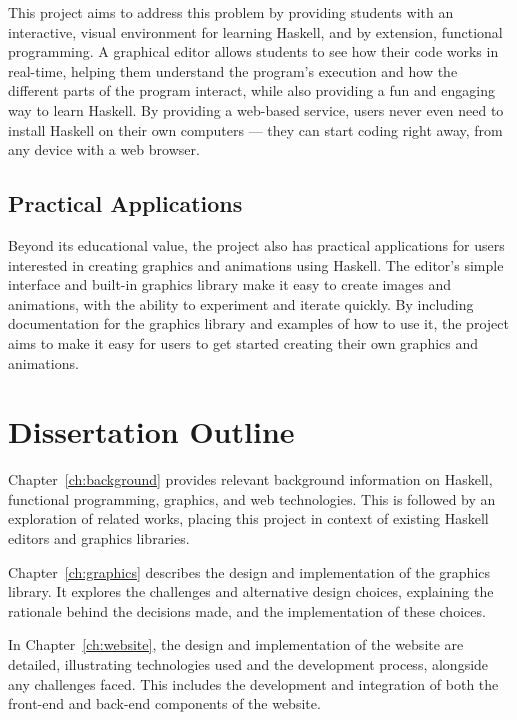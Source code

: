 \documentclass[../main.tex]{subfiles}
\begin{document}
            This project aims to address this problem by providing students with an
                interactive, visual environment for learning Haskell, and by extension,
                functional programming.
            A graphical editor allows students to see how their code works in real-time,
                helping them understand the program's execution and how the different parts of
                the program interact, while also providing a fun and engaging way to learn
                Haskell.
            By providing a web-based service, users never even need to install Haskell on
                their own computers — they can start coding right away, from any device with a
                web browser.

        \subsection{Practical Applications}
            Beyond its educational value, the project also has practical applications for
                users interested in creating graphics and animations using Haskell.
            The editor's simple interface and built-in graphics library make it easy to
                create images and animations, with the ability to experiment and iterate
                quickly.
            By including documentation for the graphics library and examples of how to use
                it, the project aims to make it easy for users to get started creating their
                own graphics and animations.

    \section{Dissertation Outline}
        Chapter~\ref{ch:background} provides relevant background information on
            Haskell, functional programming, graphics, and web technologies.
        This is followed by an exploration of related works, placing this project in
            context of existing Haskell editors and graphics libraries.

        Chapter~\ref{ch:graphics} describes the design and implementation of the
            graphics library.
        It explores the challenges and alternative design choices, explaining the
            rationale behind the decisions made, and the implementation of these choices.

        In Chapter~\ref{ch:website}, the design and implementation of the website are
            detailed, illustrating technologies used and the development process, alongside
            any challenges faced.
        This includes the development and integration of both the front-end and
            back-end components of the website.
\end{document}
